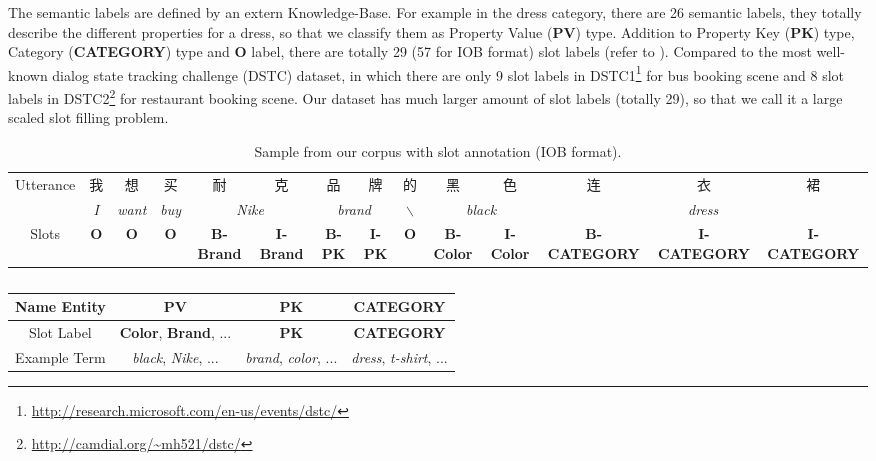 The semantic labels are defined by an extern Knowledge-Base. 
For example in the dress category, there are 26 semantic labels,
they totally describe the different properties for a dress,
so that we classify them as Property Value (\textbf{PV}) type.
Addition to Property Key (\textbf{PK}) type, Category (\textbf{CATEGORY}) type and \textbf{O} label,
there are totally 29 (57 for IOB format) slot labels (refer to ).
Compared to the most well-known dialog state tracking challenge (DSTC) dataset,
in which there are only 9 slot labels in DSTC1\footnote{\url{http://research.microsoft.com/en-us/events/dstc/}} for bus booking scene
and 8 slot labels in DSTC2\footnote{\url{http://camdial.org/~mh521/dstc/}} for restaurant booking scene.
Our dataset has much larger amount of slot labels (totally 29),
so that we call it a large scaled slot filling problem.

\begin{table*}[htbp]
	\label{tab:slot_filling_demo}
	\caption{Sample from our corpus with slot annotation (IOB format).}
	\centering
	\scriptsize
	\begin{tabular}{c|c|c|c|c|c|c|c|c|c|c|c|c|c}
		\toprule
		\multirow{2}{*}{Utterance} & 我 & 想 & 买 & 耐 & 克 & 品 & 牌 & 的 & 黑 & 色 & 连 & 衣 & 裙 \\
		\cmidrule{2-14}
		& \em{I} & \em{want} & \em{buy} & \multicolumn{2}{c|}{\em{Nike}} & \multicolumn{2}{c|}{\em{brand}} & $\backslash$  & \multicolumn{2}{c|}{\em{black}} & \multicolumn{3}{c}{\em{dress}} \\
		\midrule
		Slots & \textbf{O} & \textbf{O} & \textbf{O} & \textbf{B-Brand} & \textbf{I-Brand} & \textbf{B-PK} & \textbf{I-PK} & \textbf{O} & \textbf{B-Color} & \textbf{I-Color} & \textbf{B-CATEGORY} & \textbf{I-CATEGORY} & \textbf{I-CATEGORY} \\
		\bottomrule
	\end{tabular}
	\vspace{-10pt}
\end{table*}

\begin{table}[htbp]
	\label{tab:slot_labels}
	\caption{}
	\centering
	\scriptsize
	\begin{tabular}{c|c|c|c}
		\toprule
		Name Entity & PV & PK & CATEGORY \\
		\midrule
		Slot Label & \textbf{Color}, \textbf{Brand}, ... & \textbf{PK} & \textbf{CATEGORY} \\
		\midrule
		Example Term & \emph{black}, \emph{Nike}, ... & \emph{brand}, \emph{color}, ... & \emph{dress}, \emph{t-shirt}, ... \\
		\bottomrule
	\end{tabular}
	\vspace{-10pt}
\end{table}

